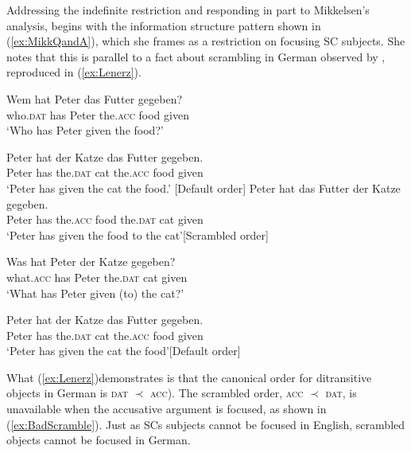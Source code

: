 \documentclass[
]{RCL}
\let\oldtrans\trans%
\renewcommand{\trans}{\oldtrans\hspace*{-\parindent}}%
\let\trans\oldtrans%
\begin{document}
Addressing the indefinite restriction and responding in part to Mikkelsen's analysis, \citet{heycock2012specification} begins with the information structure pattern shown in (\ref{ex:MikkQandA}), which she frames as a restriction on focusing SC subjects.
She notes that this is parallel to a fact about scrambling in German observed by \citet{lenerz1977zur}, reproduced in (\ref{ex:Lenerz}).
\begin{exe}\label{ex:Lenerz} 
	\ex
	\begin{xlist}
		\ex \gll Wem hat Peter das Futter gegeben?\\
			who.\textsc{dat} has Peter the.\textsc{acc} food given\\
		\trans `Who has Peter given the food?'
		\begin{xlist}
			\ex \gll Peter hat der Katze das Futter gegeben.\\
				Peter has the.\textsc{dat} cat the.\textsc{acc} food given\\
			\trans `Peter has given the cat the food.' \hfill[Default order]
			\ex \gll Peter hat das Futter der Katze gegeben.\\
			Peter has the.\textsc{acc} food the.\textsc{dat} cat given\\
			\trans `Peter has given the food to the cat'\hfill[Scrambled order]	
		\end{xlist}
		\ex \gll Was hat Peter der Katze gegeben?\\
			what.\textsc{acc} has Peter the.\textsc{dat} cat given\\
		\trans `What has Peter given (to) the cat?'
		\begin{xlist}
			\ex \gll Peter hat der Katze das Futter gegeben.\\
			Peter has the.\textsc{dat} cat the.\textsc{acc} food given\\
			\trans `Peter has given the cat the food'\hfill[Default order]
			\label{ex:BadScramble} 

		\end{xlist}
	\end{xlist}
\end{exe}
What (\ref{ex:Lenerz})demonstrates is that the canonical order for ditransitive objects in German is \textsc{dat} $\prec$ \textsc{acc}).
The scrambled order, \textsc{acc} $\prec$ \textsc{dat}, is unavailable when the accusative argument is focused, as shown in (\ref{ex:BadScramble}). 
Just as SCs subjects cannot be focused in English, scrambled objects cannot be focused in German.
\end{document}
